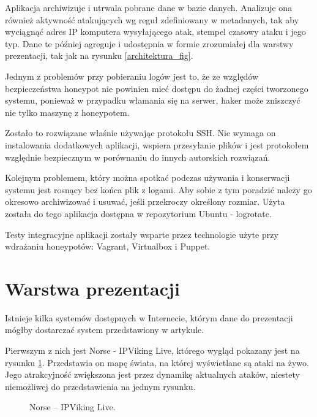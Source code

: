 \documentclass[runningheads,a4paper]{llncs}
\begin{document}
Aplikacja archiwizuje i utrwala pobrane dane w bazie danych. Analizuje ona również aktywność atakujących wg reguł zdefiniowany w metadanych, tak aby wyciągnąć adres IP komputera wysyłającego atak, stempel czasowy ataku i jego typ. Dane te później agreguje i udostępnia w formie zrozumiałej dla warstwy prezentacji, tak jak na rysunku \ref{architektura_fig}.

Jednym z problemów przy pobieraniu logów jest to, że ze względów bezpieczeństwa honeypot nie powinien mieć dostępu do żadnej części tworzonego systemu, ponieważ w przypadku włamania się na serwer, haker może zniszczyć nie tylko maszynę z honeypotem.

Zostało to rozwiązane właśnie używając protokołu SSH. Nie wymaga on instalowania dodatkowych aplikacji, wspiera przesyłanie plików i jest protokołem względnie bezpiecznym w porównaniu do innych autorskich rozwiązań.

Kolejnym problemem, który można spotkać podczas używania i konserwacji systemu jest rosnący bez końca plik z logami. Aby sobie z tym poradzić należy go okresowo archiwizować i usuwać, jeśli przekroczy określony rozmiar. Użyta została do tego aplikacja dostępna w repozytorium Ubuntu - logrotate.

Testy integracyjne aplikacji zostały wsparte przez technologie użyte przy wdrażaniu honeypotów: Vagrant, Virtualbox i Puppet.

\section{Warstwa prezentacji}

Istnieje kilka systemów dostępnych w Internecie, którym dane do prezentacji mógłby dostarczać system przedstawiony w artykule.

Pierwszym z nich jest Norse - IPViking Live, którego wygląd pokazany jest na rysunku \ref{fig:norse_fig}. Przedstawia on mapę świata, na której wyświetlane są ataki na żywo. Jego atrakcyjność zwiększona jest przez dynamikę aktualnych ataków, niestety niemożliwej do przedstawienia na jednym rysunku.

\begin{figure}
        \centering
        \caption{Norse – IPViking Live.}
        \label{fig:norse_fig}
\end{figure}
\end{document}
